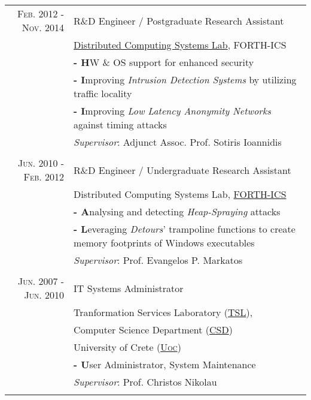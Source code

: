 \documentclass[a4paper,10pt]{article} %
\begin{document}
\begin{tabular}{r|p{}}
\textsc{Feb. 2012 - Nov. 2014} & {\large R\&D Engineer / Postgraduate Research Assistant} \\
& {\large \href{https://www.ics.forth.gr/dcs/}{Distributed Computing Systems Lab}, FORTH-ICS} \\
& \textbf{- H}W \& OS support for enhanced security \\
& \textbf{- I}mproving \emph{Intrusion Detection Systems} by utilizing traffic locality \\
& \textbf{- I}mproving \emph{Low Latency Anonymity Networks} against timing  attacks \\
& \emph{Supervisor}: Adjunct Assoc. Prof. Sotiris Ioannidis \\
\multicolumn{2}{c}{} \\

\textsc{Jun. 2010 - Feb. 2012} & {\large R\&D Engineer / Undergraduate Research Assistant} \\
& {\large Distributed Computing Systems Lab, \href{https://www.ics.forth.gr/}{\textsc{FORTH-ICS}}} \\
& \textbf{- A}nalysing and detecting \emph{Heap-Spraying} attacks \\
& \textbf{- L}everaging \emph{Detours}' trampoline functions to create memory footprints of Windows executables \\
& \emph{Supervisor}: Prof. Evangelos P. Markatos \\
\multicolumn{2}{c}{} \\

\textsc{Jun. 2007 - Jun. 2010} & {\large IT Systems Administrator} \\
& {\large Tranformation Services Laboratory (\href{http://www.tsl.gr/}{\textsc{TSL}}),} \\
& {\large Computer Science Department (\href{https://www.csd.uoc.gr/CSD/index.jsp?lang=en}{CSD})} \\
& {\large  University of Crete (\textsc{\href{http://www.en.uoc.gr/}{Uoc})}} \\
& \textbf{- U}ser Administrator, System Maintenance \\
& \emph{Supervisor}: Prof. Christos Nikolau \\
\multicolumn{2}{c}{} \\

\end{tabular}

\end{document}
